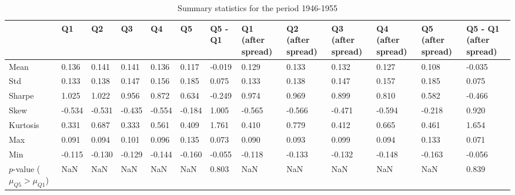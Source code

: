 \begin{table}
\caption{Summary statistics for the period 1946-1955}
\label{tab:summary_1946_1955}
\begin{tabular}{lllllllllllll}
\toprule
 & Q1 & Q2 & Q3 & Q4 & Q5 & Q5 - Q1 & Q1 (after spread) & Q2 (after spread) & Q3 (after spread) & Q4 (after spread) & Q5 (after spread) & Q5 - Q1 (after spread) \\
\midrule
Mean & 0.136 & 0.141 & 0.141 & 0.136 & 0.117 & -0.019 & 0.129 & 0.133 & 0.132 & 0.127 & 0.108 & -0.035 \\
Std & 0.133 & 0.138 & 0.147 & 0.156 & 0.185 & 0.075 & 0.133 & 0.138 & 0.147 & 0.157 & 0.185 & 0.075 \\
Sharpe & 1.025 & 1.022 & 0.956 & 0.872 & 0.634 & -0.249 & 0.974 & 0.969 & 0.899 & 0.810 & 0.582 & -0.466 \\
Skew & -0.534 & -0.531 & -0.435 & -0.554 & -0.184 & 1.005 & -0.565 & -0.566 & -0.471 & -0.594 & -0.218 & 0.920 \\
Kurtosis & 0.331 & 0.687 & 0.333 & 0.561 & 0.409 & 1.761 & 0.410 & 0.779 & 0.412 & 0.665 & 0.461 & 1.654 \\
Max & 0.091 & 0.094 & 0.101 & 0.096 & 0.135 & 0.073 & 0.090 & 0.093 & 0.099 & 0.094 & 0.133 & 0.071 \\
Min & -0.115 & -0.130 & -0.129 & -0.144 & -0.160 & -0.055 & -0.118 & -0.133 & -0.132 & -0.148 & -0.163 & -0.056 \\
$p$-value ($\mu_{Q5} > \mu_{Q1}$) & NaN & NaN & NaN & NaN & NaN & 0.803 & NaN & NaN & NaN & NaN & NaN & 0.839 \\
\bottomrule
\end{tabular}
\end{table}
